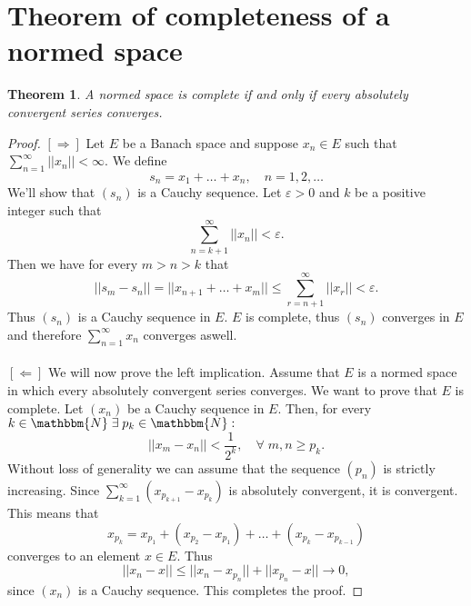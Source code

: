 \documentclass[12pt, a4paper]{article}
\newcommand{\N}{\ensuremath{\mathbbm{N}}}
\newtheorem{theorem}{Theorem}[section]
\begin{document}
\section{Theorem of completeness of a normed space}
\begin{theorem}
A normed space is complete if and only if every absolutely convergent series converges.
\end{theorem}
\begin{proof}
$[\Rightarrow]$ Let $E$ be a Banach space and suppose $x_n\in E$ such that $\sum_{n=1}^\infty ||x_n||<\infty.$ We define
\begin{equation*}
s_n = x_1 + \dots + x_n,\quad n=1,2,\dots
\end{equation*}
We'll show that $(s_n)$ is a Cauchy sequence. Let $\varepsilon>0$ and $k$ be a positive integer such that
\begin{equation*}
\sum_{n=k+1}^\infty ||x_n|| < \varepsilon.
\end{equation*}
Then we have for every $m>n>k$ that
\begin{equation*}
||s_m - s_n|| = ||x_{n+1} + \dots + x_m|| \leq \sum_{r=n+1}^\infty ||x_r|| < \varepsilon.
\end{equation*}
Thus $(s_n)$ is a Cauchy sequence in $E$. $E$ is complete, thus $(s_n)$ converges in $E$ and therefore $\sum_{n=1}^\infty x_n$ converges aswell.
\\\\
$[\Leftarrow]$ We will now prove the left implication. Assume that $E$ is a normed space in which every absolutely convergent series converges. We want to prove that $E$ is complete. Let $(x_n)$ be a Cauchy sequence in $E$. Then, for every $k\in\N\; \exists\; p_k \in \N : $
\begin{equation*}
||x_m - x_n|| < \frac{1}{2^k}, \quad \forall\; m,n \geq p_k.
\end{equation*}
Without loss of generality we can assume that the sequence $(p_n)$ is strictly increasing. Since $\sum_{k=1}^\infty (x_{p_{k+1}} - x_{p_k})$ is absolutely convergent, it is convergent. This means that
\begin{equation*}
x_{p_k} = x_{p_1} + (x_{p_2} - x_{p_1}) + \dots + (x_{p_k} - x_{p_{k-1}})
\end{equation*}
converges to an element $x\in E$. Thus
\begin{equation*}
||x_n - x|| \leq || x_n - x_{p_n} || + ||x_{p_n} - x|| \to 0,
\end{equation*}
since $(x_n)$ is a Cauchy sequence. This completes the proof.
\end{proof}
\end{document}
